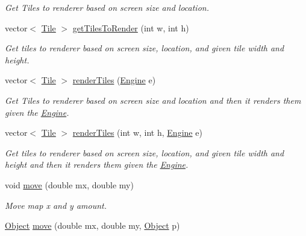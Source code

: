 \begin{DoxyCompactItemize}
\begin{DoxyCompactList}\small\item\em Get Tiles to renderer based on screen size and location. \end{DoxyCompactList}\item 
vector$<$ \hyperlink{classTile}{Tile} $>$ \hyperlink{classTileset_a2f21ec594886baf1bbb990a57dca8bfc}{get\+Tiles\+To\+Render} (int w, int h)\hypertarget{classTileset_a2f21ec594886baf1bbb990a57dca8bfc}{}\label{classTileset_a2f21ec594886baf1bbb990a57dca8bfc}

\begin{DoxyCompactList}\small\item\em Get tiles to renderer based on screen size, location, and given tile width and height. \end{DoxyCompactList}\item 
vector$<$ \hyperlink{classTile}{Tile} $>$ \hyperlink{classTileset_a2ae52c2d3b6bf86775456837cc3b2269}{render\+Tiles} (\hyperlink{classEngine}{Engine} e)\hypertarget{classTileset_a2ae52c2d3b6bf86775456837cc3b2269}{}\label{classTileset_a2ae52c2d3b6bf86775456837cc3b2269}

\begin{DoxyCompactList}\small\item\em Get Tiles to renderer based on screen size and location and then it renders them given the \hyperlink{classEngine}{Engine}. \end{DoxyCompactList}\item 
vector$<$ \hyperlink{classTile}{Tile} $>$ \hyperlink{classTileset_a91610c970654958029f8d89526846460}{render\+Tiles} (int w, int h, \hyperlink{classEngine}{Engine} e)\hypertarget{classTileset_a91610c970654958029f8d89526846460}{}\label{classTileset_a91610c970654958029f8d89526846460}

\begin{DoxyCompactList}\small\item\em Get tiles to renderer based on screen size, location, and given tile width and height and then it renders them given the \hyperlink{classEngine}{Engine}. \end{DoxyCompactList}\item 
void \hyperlink{classTileset_a592ad17ba76112a7ee46df52f9a44e3a}{move} (double mx, double my)\hypertarget{classTileset_a592ad17ba76112a7ee46df52f9a44e3a}{}\label{classTileset_a592ad17ba76112a7ee46df52f9a44e3a}

\begin{DoxyCompactList}\small\item\em Move map x and y amount. \end{DoxyCompactList}\item 
\hyperlink{classObject}{Object} \hyperlink{classTileset_a1e3351adc4d2828b2d276955c0c7cbfe}{move} (double mx, double my, \hyperlink{classObject}{Object} p)\hypertarget{classTileset_a1e3351adc4d2828b2d276955c0c7cbfe}{}\label{classTileset_a1e3351adc4d2828b2d276955c0c7cbfe}


\end{DoxyCompactItemize}
